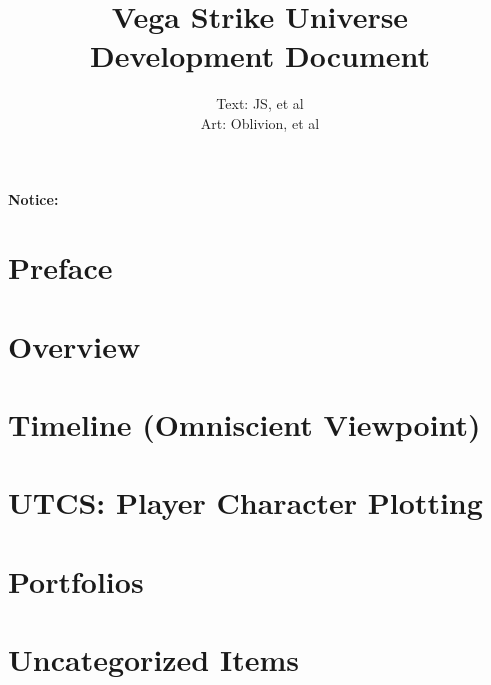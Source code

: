 

\title{Vega Strike Universe \\ 
Development Document}

\author{Text: JS, et al\\
Art: Oblivion, et al}

\renewcommand{\thepage}{\roman{page}}
\maketitle
\renewcommand{\thepage}{\arabic{page}}
\thispagestyle{empty}
\centerline{\bf {\Huge Notice:}}
{\it

}

\setcounter{tocdepth}{2}
\clearpage
{}
\tableofcontents
\listoftables
{}
\listoffigures
{}

\chapter*{Preface}


\chapter{Overview}


\chapter{Timeline (Omniscient Viewpoint)}


\chapter{UTCS: Player Character Plotting}


\chapter{Portfolios}


\chapter{Uncategorized Items}



